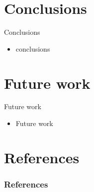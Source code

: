 \documentclass[aspectratio=169]{beamer}
\begin{document}
\section{Conclusions}
\begin{frame}{Conclusions}
    \begin{itemize}
        \item conclusions
    \end{itemize}
\end{frame}


\section{Future work}
\begin{frame}{Future work}
    \begin{itemize}
        \item Future work
    \end{itemize}
\end{frame}

\section{References}
\begin{frame}[allowframebreaks]%
\frametitle{References}
{\tiny 


}
\end{frame}
\end{document}
